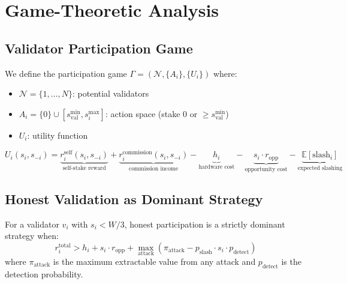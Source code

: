 \section{Game-Theoretic Analysis}
\label{sec:game}

\subsection{Validator Participation Game}

We define the participation game $\Gamma = (\mathcal{N}, \{A_i\}, \{U_i\})$ where:
\begin{itemize}
    \item $\mathcal{N} = \{1, \ldots, N\}$: potential validators
    \item $A_i = \{0\} \cup [s^{\min}_{\text{val}}, s_i^{\max}]$: action space (stake 0 or $\geq s^{\min}_{\text{val}}$)
    \item $U_i$: utility function
\end{itemize}

\begin{definition}
\begin{equation}
    U_i(s_i, s_{-i}) = \underbrace{r_i^{\text{self}}(s_i, s_{-i})}_{\text{self-stake reward}} + \underbrace{r_i^{\text{commission}}(s_i, s_{-i})}_{\text{commission income}} - \underbrace{h_i}_{\text{hardware cost}} - \underbrace{s_i \cdot r_{\text{opp}}}_{\text{opportunity cost}} - \underbrace{\mathbb{E}[\text{slash}_i]}_{\text{expected slashing}}
\end{equation}
\end{definition}

\subsection{Honest Validation as Dominant Strategy}

\begin{theorem}\label{thm:ic}
For a validator $v_i$ with $s_i < W/3$, honest participation is a strictly dominant strategy when:
\begin{equation}
    r_i^{\text{total}} > h_i + s_i \cdot r_{\text{opp}} + \max_{\text{attack}} \left(\pi_{\text{attack}} - p_{\text{slash}} \cdot s_i \cdot p_{\text{detect}}\right)
\end{equation}
where $\pi_{\text{attack}}$ is the maximum extractable value from any attack and $p_{\text{detect}}$ is the detection probability.
\end{theorem}


